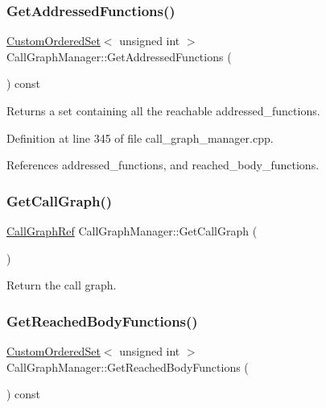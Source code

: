 \subsubsection{\texorpdfstring{Get\+Addressed\+Functions()}{GetAddressedFunctions()}}
{\footnotesize\ttfamily \hyperlink{classCustomOrderedSet}{Custom\+Ordered\+Set}$<$ unsigned int $>$ Call\+Graph\+Manager\+::\+Get\+Addressed\+Functions (\begin{DoxyParamCaption}{ }\end{DoxyParamCaption}) const}



Returns a set containing all the reachable addressed\+\_\+functions. 



Definition at line 345 of file call\+\_\+graph\+\_\+manager.\+cpp.



References addressed\+\_\+functions, and reached\+\_\+body\+\_\+functions.

\mbox{\label{classCallGraphManager_a3803aead51f1c180af7d4e28aca8d3d0}} 
\subsubsection{\texorpdfstring{Get\+Call\+Graph()}{GetCallGraph()}}
{\footnotesize\ttfamily \hyperlink{call__graph_8hpp_a58f2b421619a32f5c5bc35e64f3346d3}{Call\+Graph\+Ref} Call\+Graph\+Manager\+::\+Get\+Call\+Graph (\begin{DoxyParamCaption}{ }\end{DoxyParamCaption})}



Return the call graph. 

\mbox{\label{classCallGraphManager_a12c4d7b31674d81c02d0b4bf3150433f}} 
\subsubsection{\texorpdfstring{Get\+Reached\+Body\+Functions()}{GetReachedBodyFunctions()}}
{\footnotesize\ttfamily \hyperlink{classCustomOrderedSet}{Custom\+Ordered\+Set}$<$ unsigned int $>$ Call\+Graph\+Manager\+::\+Get\+Reached\+Body\+Functions (\begin{DoxyParamCaption}{ }\end{DoxyParamCaption}) const}



